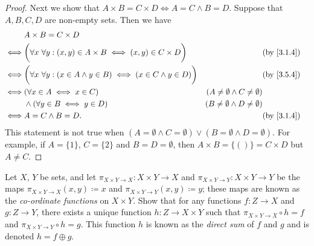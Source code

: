 \begin{proof}
  Next we show that \(A \times B = C \times D \iff A = C \land B = D\).
  Suppose that \(A, B, C, D\) are non-empty sets.
  Then we have
  \begin{align*}
         & A \times B = C \times D                                                                                                                           \\
    \iff & \bigg(\forall x \ \forall y : (x, y) \in A \times B \iff (x, y) \in C \times D\bigg)     &                                           & \by{3.1.4} \\
    \iff & \bigg(\forall x \ \forall y : (x \in A \land y \in B) \iff (x \in C \land y \in D)\bigg) &                                           & \by{3.5.4} \\
    \iff & (\forall x \in A \iff x \in C)                                                           & (A \neq \emptyset \land C \neq \emptyset)              \\
         & \land (\forall y \in B \iff y \in D)                                                     & (B \neq \emptyset \land D \neq \emptyset)              \\
    \iff & A = C \land B = D.                                                                       &                                           & \by{3.1.4}
  \end{align*}
  This statement is not true when \((A = \emptyset \land C = \emptyset) \lor (B = \emptyset \land D = \emptyset)\).
  For example, if \(A = \{1\}\), \(C = \{2\}\) and \(B = D = \emptyset\), then \(A \times B = \{()\} = C \times D\) but \(A \neq C\).
\end{proof}

\begin{ex}\label{ex:3.5.7}
  Let \(X\), \(Y\) be sets, and let \(\pi_{X \times Y \to X} : X \times Y \to X\) and \(\pi_{X \times Y \to Y} : X \times Y \to Y\) be the maps \(\pi_{X \times Y \to X}(x, y) \coloneqq x\) and \(\pi_{X \times Y \to Y}(x, y) \coloneqq y\);
  these maps are known as the \emph{co-ordinate functions} on \(X \times Y\).
  Show that for any functions \(f : Z \to X\) and \(g : Z \to Y\), there exists a unique function \(h : Z \to X \times Y\) such that \(\pi_{X \times Y \to X} \circ h = f\) and \(\pi_{X \times Y \to Y} \circ h = g\).
  This function \(h\) is known as the \emph{direct sum} of \(f\) and \(g\) and is denoted \(h = f \oplus g\).
\end{ex}

